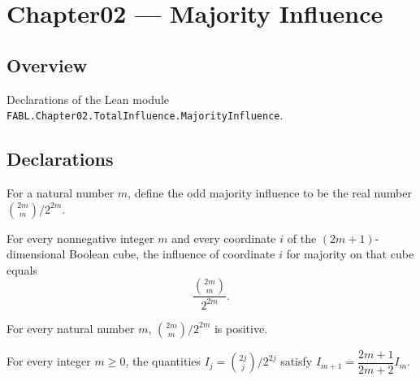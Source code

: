 \chapter{Chapter02 — Majority Influence}
\section{Overview}

Declarations of the Lean module \texttt{FABL.Chapter02.TotalInfluence.MajorityInfluence}.

\section{Declarations}

\begin{definition}
\label{FABL.oddMajorityInfluence}
\leanok
For a natural number $m$, define the odd majority influence to be the real number
$\binom{2m}{m}/2^{2m}$.
\end{definition}

\begin{theorem}
\label{FABL.booleanInfluence_majority_odd_eq_oddMajorityInfluence}
\leanok
{}
For every nonnegative integer $m$ and every coordinate $i$ of the $(2m+1)$-dimensional
Boolean cube, the influence of coordinate $i$ for majority on that cube equals
$$\frac{\binom{2m}{m}}{2^{2m}}.$$
\end{theorem}

\begin{theorem}
\label{FABL.oddMajorityInfluence_pos}
\leanok
{}
For every natural number $m$, $\binom{2m}{m}/2^{2m}$ is positive.
\end{theorem}

\begin{theorem}
\label{FABL.oddMajorityInfluence_succ}
\leanok
{}
For every integer $m\ge 0$, the quantities $I_j=\binom{2j}{j}/2^{2j}$ satisfy
$I_{m+1}=\dfrac{2m+1}{2m+2}I_m$.
\end{theorem}

